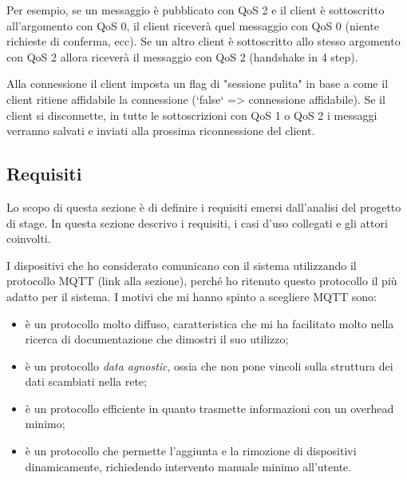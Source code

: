 Per esempio, se un messaggio è pubblicato con QoS 2 e il client è sottoscritto all'argomento con QoS 0, il client riceverà quel messaggio con QoS 0 (niente richieste di conferma, ecc).
Se un altro client è sottoscritto allo stesso argomento con QoS 2 allora riceverà il messaggio con QoS 2 (handshake in 4 step).

Alla connessione il client imposta un flag di "sessione pulita" in base a come il client ritiene affidabile la connessione (`false` => connessione affidabile). Se il client si disconnette, in tutte le sottoscrizioni con QoS 1 o QoS 2 i messaggi verranno salvati e inviati alla prossima riconnessione del client.

\subsection{Requisiti}

Lo scopo di questa sezione è di definire i requisiti emersi dall’analisi del progetto di stage.
In questa sezione descrivo i requisiti, i casi d'uso collegati e gli attori coinvolti.

I dispositivi che ho considerato comunicano con il sistema utilizzando il protocollo MQTT (link alla sezione), perché ho ritenuto questo protocollo il più adatto per il sistema.
I motivi che mi hanno spinto a scegliere MQTT sono:
\begin{itemize}
	\item è un protocollo molto diffuso, caratteristica che mi ha facilitato molto nella ricerca di documentazione che dimostri il suo utilizzo;
	\item è un protocollo \emph{data agnostic}, ossia che non pone vincoli sulla struttura dei dati scambiati nella rete;
	\item è un protocollo efficiente in quanto trasmette informazioni con un overhead minimo;
	\item è un protocollo che permette l'aggiunta e la rimozione di dispositivi dinamicamente,  richiedendo intervento manuale minimo all'utente.
\end{itemize}

